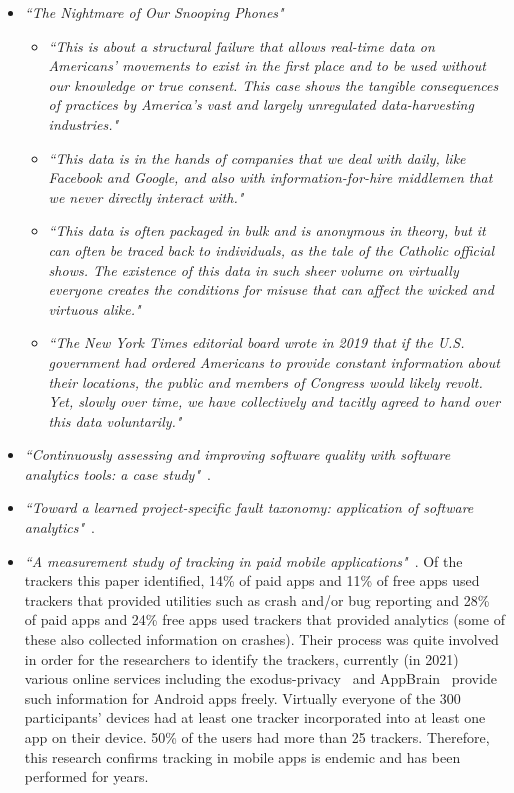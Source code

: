 \begin{itemize}
    \item \emph{``The Nightmare of Our Snooping Phones"}~\citep{nytimes20210721_the_nightmare_of_our_snooping_phones}
    \begin{itemize}
        \item \emph{``This is about a structural failure that allows real-time data on Americans’ movements to exist in the first place and to be used without our knowledge or true consent. This case shows the tangible consequences of practices by America’s vast and largely unregulated data-harvesting industries."}
        \item \emph{``This data is in the hands of companies that we deal with daily, like Facebook and Google, and also with information-for-hire middlemen that we never directly interact with."}
        \item \emph{``This data is often packaged in bulk and is anonymous in theory, but it can often be traced back to individuals, as the tale of the Catholic official shows. The existence of this data in such sheer volume on virtually everyone creates the conditions for misuse that can affect the wicked and virtuous alike."}
        \item \emph{``The New York Times editorial board wrote in 2019 that if the U.S. government had ordered Americans to provide constant information about their locations, the public and members of Congress would likely revolt. Yet, slowly over time, we have collectively and tacitly agreed to hand over this data voluntarily."}
    \end{itemize}
    
    \item \emph{``Continuously assessing and improving software quality with software analytics tools: a case study"}~\cite{martinez_fernandez2019_continuously_assessing_and_improving_software_quality_with_software_analytics_tools}.
    
    \item \emph{``Toward a learned project-specific fault taxonomy: application of software analytics"}~\cite{kidwell2015_toward_fault_taxonomy_application_of_software_analytics}.
    
    \item \emph{``A measurement study of tracking in paid mobile applications"}~\citep{seneviratne2015_a_measurement_study_of_tracking_in_paid_mobile_apps}. Of the trackers this paper identified, 14\% of paid apps and 11\% of free apps used trackers that provided utilities such as crash and/or bug reporting and 28\% of paid apps and 24\% free apps used trackers that provided analytics (some of these also collected information on crashes). Their process was quite involved in order for the researchers to identify the trackers, currently (in 2021) various online services including the exodus-privacy~\citep{exodus_privacy_project} and AppBrain~\citep{appbrain} provide such information for Android apps freely. Virtually everyone of the 300 participants' devices had at least one tracker incorporated into at least one app on their device. 50\% of the users had more than 25 trackers. Therefore, this research confirms tracking in mobile apps is endemic and has been performed for years. 
    

\end{itemize}
